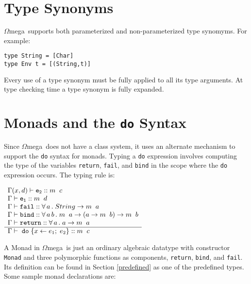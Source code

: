 \documentclass[11pt,twoside]{article}
\newcommand{\om}{$\Omega$mega}
\begin{document}
\section{Type Synonyms} \label{syn}
\om\ supports both parameterized  and non-parameterized type synomyms.
For example:
\begin{verbatim}
type String = [Char]
type Env t = [(String,t)]
\end{verbatim}
Every use of a type synonym must be fully applied to all
its type arguments. At type checking time a type synonym
is fully expanded.

\section{Monads and the {\tt do} Syntax} \label{monads}
Since \om\ does not have a class system, it uses an alternate mechanism
to support the {\tt do} syntax for monads. Typing a {\tt do} expression
involves computing the type of the variables {\tt return}, {\tt fail},
and {\tt bind} in the scope where the {\tt do} expression occurs.
The typing rule is:
\vspace*{.1in}

$
\begin{array}{l}
 \Gamma(x,d) \vdash {\tt e_2} :: m\;\; c \\ 
 \Gamma \vdash {\tt e_1} :: m\;\; d \\ 
 \Gamma \vdash {\tt fail} ::  \forall\, a\, .\;String \rightarrow m\;\; a\\ 
 \Gamma \vdash {\tt bind} :: \forall\, a\, b\, .\; m\;\;a \rightarrow (a \rightarrow m\;\; b) \rightarrow m\;\; b\\ 
 \Gamma \vdash {\tt return} :: \forall\, a\, .\; a \rightarrow m\;\; a \\ \hline
 \Gamma \vdash \;{\tt do}\; \{ x  \leftarrow e_1; \; e_2 \} :: m\;\;c \
 \end{array}
$

\vspace*{.2in}
A Monad in \om\ is just an ordinary algebraic datatype with constructor {\tt
Monad} and three polymorphic functions as components, {\tt return}, {\tt bind},
and {\tt fail}. Its definition can be found in Section \ref{predefined} as one
of the predefined types. Some sample monad declarations are:
\end{document}
